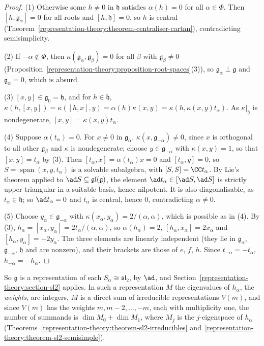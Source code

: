 \begin{proof}
(1) Otherwise some $h \neq 0$ in $\mathfrak{h}$ satisfies $\alpha(h) = 0$ for all $\alpha \in \Phi$. Then $[h, \mathfrak{g}_\alpha] = 0$ for all roots and $[h, \mathfrak{h}] = 0$, so $h$
is central (Theorem~\ref{representation-theory:theorem-centraliser-cartan}), contradicting semisimplicity.

(2) If $-\alpha \notin \Phi$, then $\kappa(\mathfrak{g}_\alpha, \mathfrak{g}_\beta) = 0$ for all $\beta$ with $\mathfrak{g}_\beta \neq 0$
(Proposition~\ref{representation-theory:proposition-root-spaces}(3)), so $\mathfrak{g}_\alpha \perp \mathfrak{g}$ and $\mathfrak{g}_\alpha = 0$, which is absurd.

(3) $[x, y] \in \mathfrak{g}_0 = \mathfrak{h}$, and for $h \in \mathfrak{h}$, $\kappa(h, [x, y]) = \kappa([h, x], y) = \alpha(h)\kappa(x, y) = \kappa(h, \kappa(x, y)t_\alpha)$. As
$\kappa|_{\mathfrak{h}}$ is nondegenerate, $[x, y] = \kappa(x, y)t_\alpha$.

(4) Suppose $\alpha(t_\alpha) = 0$. For $x \neq 0$ in $\mathfrak{g}_\alpha$, $\kappa(x, \mathfrak{g}_{-\alpha}) \neq 0$, since $x$ is orthogonal to all other $\mathfrak{g}_\beta$ and
$\kappa$ is nondegenerate; choose $y \in \mathfrak{g}_{-\alpha}$ with $\kappa(x, y) = 1$, so that $[x, y] = t_\alpha$ by (3). Then $[t_\alpha, x] = \alpha(t_\alpha)x = 0$ and
$[t_\alpha, y] = 0$, so $S = \operatorname{span}(x, y, t_\alpha)$ is a solvable subalgebra, with $[S, S] = \CC t_\alpha$. By Lie's theorem applied to $\ad S \subseteq \mathfrak{gl}(\mathfrak{g})$,
the element $\ad t_\alpha \in [\ad S, \ad S]$ is strictly upper triangular in a suitable basis, hence nilpotent. It is also diagonalisable, as $t_\alpha \in \mathfrak{h}$; so
$\ad t_\alpha = 0$ and $t_\alpha$ is central, hence $0$, contradicting $\alpha \neq 0$.

(5) Choose $y_\alpha \in \mathfrak{g}_{-\alpha}$ with $\kappa(x_\alpha, y_\alpha) = 2/(\alpha, \alpha)$, which is possible as in (4). By (3), $h_\alpha = [x_\alpha, y_\alpha] =
2t_\alpha/(\alpha, \alpha)$, so $\alpha(h_\alpha) = 2$, $[h_\alpha, x_\alpha] = 2x_\alpha$ and $[h_\alpha, y_\alpha] = -2y_\alpha$. The three elements are linearly independent (they lie in
$\mathfrak{g}_\alpha$, $\mathfrak{g}_{-\alpha}$, $\mathfrak{h}$ and are nonzero), and their brackets are those of $e$, $f$, $h$. Since $t_{-\alpha} = -t_\alpha$, $h_{-\alpha} = -h_\alpha$.
\end{proof}

So $\mathfrak{g}$ is a representation of each $S_\alpha \cong \mathfrak{sl}_2$, by $\ad$, and Section~\ref{representation-theory:section-sl2} applies. In such a representation $M$ the
eigenvalues of $h_\alpha$, the \emph{weights}, are integers, $M$ is a direct sum of irreducible representations $V(m)$, and since $V(m)$ has the weights
$m, m - 2, \ldots, -m$, each with multiplicity one, the number of summands is $\dim M_0 + \dim M_1$, where $M_j$ is the $j$-eigenspace of $h_\alpha$
(Theorems~\ref{representation-theory:theorem-sl2-irreducibles} and~\ref{representation-theory:theorem-sl2-semisimple}).


